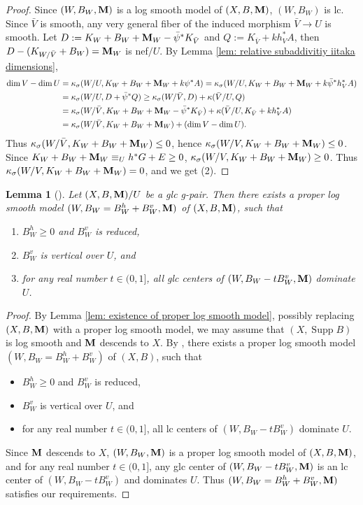 \documentclass[11pt]{amsart}
\numberwithin{equation}{section}
\newcommand{\Mm}{{\bf{M}}}
\newcommand{\Supp}{\operatorname{Supp}}
\newtheorem{lem}[thm]{Lemma}
\theoremstyle{definition}
\theoremstyle{definition}
\theoremstyle{definition}
\begin{document}
\begin{proof}
Since $(W,B_W,\Mm)$ is a log smooth model of $(X,B,\Mm)$, $(W,B_W)$ is lc. Since $\bar V$ is smooth, any very general fiber of the induced morphism $\bar V\rightarrow U$ is smooth. Let $D:=K_W+B_W+\Mm_W-\bar\psi^*K_{\bar V}$ and $Q:=K_{\bar V}+kh_V^*A$, then $D-(K_{W/\bar V}+B_W)=\Mm_W$ is nef$/U$. By Lemma \ref{lem: relative subaddivitiy iitaka dimensions},
 \begin{align*}
    \dim V-\dim U&=\kappa_{\sigma}(W/U,K_W+B_W+\Mm_W+k\psi^*A)=\kappa_{\sigma}(W/U,K_W+B_W+\Mm_W+k\bar\psi^*h_V^*A)\\
    &=\kappa_{\sigma}(W/U,D+\bar\psi^*Q)\geq \kappa_{\sigma}(W/\bar V,D)+\kappa(\bar V/U,Q)\\
    &=\kappa_{\sigma}(W/\bar V,K_W+B_W+\Mm_W-\bar\psi^*K_{\bar V})+\kappa(\bar V/U,K_{\bar V}+kh_V^*A)\\
    &=\kappa_{\sigma}(W/\bar V,K_W+B_W+\Mm_W)+(\dim V-\dim U).
\end{align*}
Thus $\kappa_{\sigma}(W/\bar V,K_W+B_W+\Mm_W)\leq 0$, hence $\kappa_{\sigma}(W/V,K_W+B_W+\Mm_W)\leq 0$. Since $K_W+B_W+\Mm_W\equiv_U h^*G+E\geq 0$, $\kappa_{\sigma}(W/V,K_W+B_W+\Mm_W)\geq 0$. Thus $\kappa_{\sigma}(W/V,K_W+B_W+\Mm_W)=0$, and we get (2).
\end{proof}


\begin{lem}[{\cite[Version 2, Lemma 8.4]{HL21}}]\label{lem: special proper log smooth model}
Let $(X,B,\Mm)/U$ be a glc g-pair. Then there exists a proper log smooth model $(W,B_W=B_W^h+B_W^v,\Mm)$ of $(X,B,\Mm)$, such that
\begin{enumerate}
    \item $B_W^h\geq 0$ and $B_W^v$ is reduced,
    \item $B_W^v$ is vertical over $U$, and
    \item for any real number $t\in (0,1]$, all glc centers of $(W,B_W-tB_W^v,\Mm)$ dominate $U$.
\end{enumerate}

\end{lem}
\begin{proof}
By Lemma \ref{lem: existence of proper log smooth model}, possibly replacing $(X,B,\Mm)$ with a proper log smooth model, we may assume that $(X,\Supp B)$ is log smooth and $\Mm$ descends to $X$. By \cite[Lemma 2.10]{Has18}, there exists a proper log smooth model $(W,B_W=B_W^h+B_W^v)$ of $(X,B)$, such that
\begin{itemize}
    \item $B_W^h\geq 0$ and $B_W^v$ is reduced,
    \item $B_W^v$ is vertical over $U$, and
    \item for any real number $t\in (0,1]$, all lc centers of $(W,B_W-tB_W^v)$ dominate $U$.
\end{itemize}
Since $\Mm$ descends to $X$, $(W,B_W,\Mm)$ is a proper log smooth model of $(X,B,\Mm)$, and for any real number $t\in (0,1]$, any glc center of $(W,B_W-tB_W^v,\Mm)$ is an lc center of $(W,B_W-tB_W^v)$ and dominates $U$. Thus $(W,B_W=B_W^h+B_W^v,\Mm)$ satisfies our requirements.
\end{proof}
\end{document}
